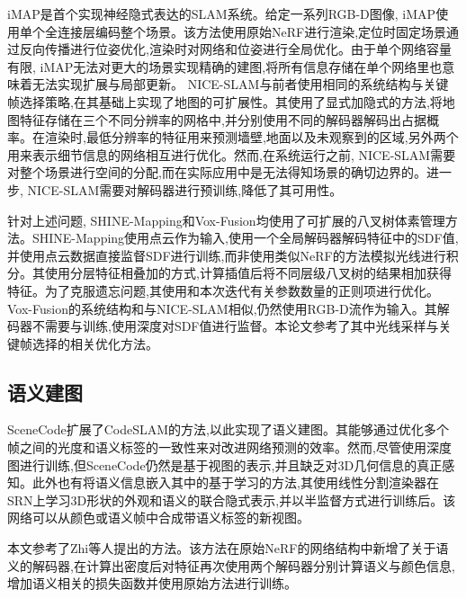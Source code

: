 iMAP\cite{imap}是首个实现神经隐式表达的SLAM系统。给定一系列RGB-D图像, iMAP使用单个全连接层编码整个场景。该方法使用原始NeRF进行渲染,定位时固定场景通过反向传播进行位姿优化,渲染时对网络和位姿进行全局优化。由于单个网络容量有限, iMAP无法对更大的场景实现精确的建图,将所有信息存储在单个网络里也意味着无法实现扩展与局部更新。 NICE-SLAM\cite{nice}与前者使用相同的系统结构与关键帧选择策略,在其基础上实现了地图的可扩展性。其使用了显式加隐式的方法,将地图特征存储在三个不同分辨率的网格中,并分别使用不同的解码器解码出占据概率。在渲染时,最低分辨率的特征用来预测墙壁,地面以及未观察到的区域,另外两个用来表示细节信息的网络相互进行优化。然而,在系统运行之前, NICE-SLAM需要对整个场景进行空间的分配,而在实际应用中是无法得知场景的确切边界的。进一步, NICE-SLAM需要对解码器进行预训练,降低了其可用性。

针对上述问题, SHINE-Mapping\cite{shine}和Vox-Fusion\cite{vox}均使用了可扩展的八叉树体素管理方法。SHINE-Mapping使用点云作为输入,使用一个全局解码器解码特征中的SDF值,并使用点云数据直接监督SDF进行训练,而非使用类似NeRF的方法模拟光线进行积分。其使用分层特征相叠加的方式,计算插值后将不同层级八叉树的结果相加获得特征。为了克服遗忘问题,其使用和本次迭代有关参数数量的正则项进行优化。Vox-Fusion的系统结构和与NICE-SLAM相似,仍然使用RGB-D流作为输入。其解码器不需要与训练,使用深度对SDF值进行监督。本论文参考了其中光线采样与关键帧选择的相关优化方法。

\subsection{语义建图}
SceneCode\cite{scenecode}扩展了CodeSLAM的方法,以此实现了语义建图。其能够通过优化多个帧之间的光度和语义标签的一致性来对改进网络预测的效率。然而,尽管使用深度图进行训练,但SceneCode仍然是基于视图的表示,并且缺乏对3D几何信息的真正感知。此外也有将语义信息嵌入其中的基于学习的方法\cite{semantic2},其使用线性分割渲染器在SRN上学习3D形状的外观和语义的联合隐式表示,并以半监督方式进行训练后。该网络可以从颜色或语义帧中合成带语义标签的新视图。

本文参考了Zhi等人提出的方法\cite{sem_nerf}。该方法在原始NeRF的网络结构中新增了关于语义的解码器,在计算出密度后对特征再次使用两个解码器分别计算语义与颜色信息,增加语义相关的损失函数并使用原始方法进行训练。